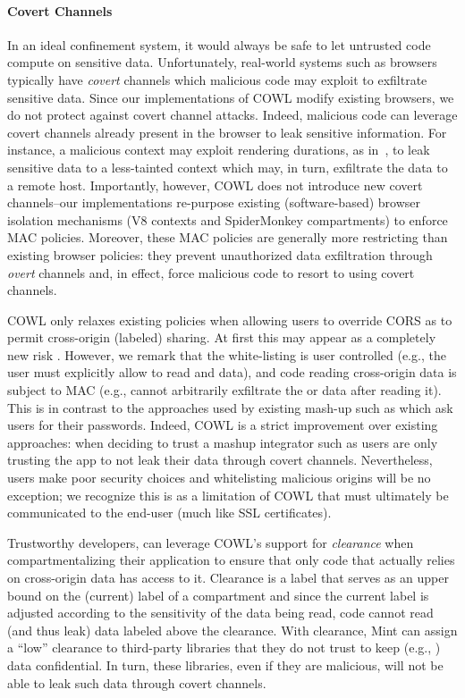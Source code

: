 \paragraph{Covert Channels}
In an ideal confinement system, it would always be safe to let untrusted
code compute on sensitive data.
%
Unfortunately, real-world systems such as browsers typically have
\emph{covert} channels which malicious code may exploit to exfiltrate
sensitive data.
%
Since our implementations of COWL modify existing browsers, we do not
protect against covert channel attacks.
%
Indeed, malicious code can leverage covert channels already present in
the browser to leak sensitive information.
%
For instance, a malicious context may exploit rendering durations,
as in~\tocite{}, to leak sensitive data to a less-tainted context
which may, in turn, exfiltrate the data to a remote host.
%
Importantly, however, COWL does not introduce new covert channels--our
implementations re-purpose existing (software-based) browser isolation
mechanisms (V8 contexts and SpiderMonkey compartments) to enforce MAC
policies.
%
Moreover, these MAC policies are generally more restricting than
existing browser policies: they prevent unauthorized data exfiltration
through \emph{overt} channels and, in effect, force malicious code to
resort to using covert channels.


COWL only relaxes existing policies when allowing users to override
CORS as to permit cross-origin (labeled) sharing.
%
At first this may appear as a completely new risk .
%
However, we remark that the white-listing is user controlled (e.g.,
the user must explicitly allow  to read
 and  data), and code reading
cross-origin data is subject to MAC (e.g.,  cannot
arbitrarily exfiltrate the  or 
data after reading it).
%
This is in contrast to the approaches used by existing mash-up such as
 which ask users for their passwords.
%
Indeed, COWL is a strict improvement over existing approaches: when
deciding to trust a mashup integrator such as  users
are only trusting the app to not leak their data through covert
channels.
%
Nevertheless, users make poor security choices and whitelisting
malicious origins will be no exception; we recognize this is as a
limitation of COWL that must ultimately be communicated to the end-user
(much like SSL certificates).

Trustworthy developers, can leverage COWL's support for
\emph{clearance} when compartmentalizing their application to ensure
that only code that actually relies on cross-origin data has access to
it.
%
Clearance is a label that serves as an upper bound on the (current)
label of a compartment and since the current label is adjusted
according to the sensitivity of the data being read, code cannot read
(and thus leak) data labeled above the clearance.
%
With clearance, Mint can assign a ``low'' clearance to
third-party libraries that they do not trust to keep (e.g.,
) data confidential.
%
In turn, these libraries, even if they are malicious, will not be able
to leak such data through covert channels.

